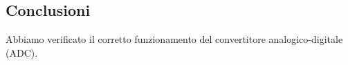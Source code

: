 \subsection*{Conclusioni}

Abbiamo verificato il corretto funzionamento del convertitore analogico-digitale (ADC).